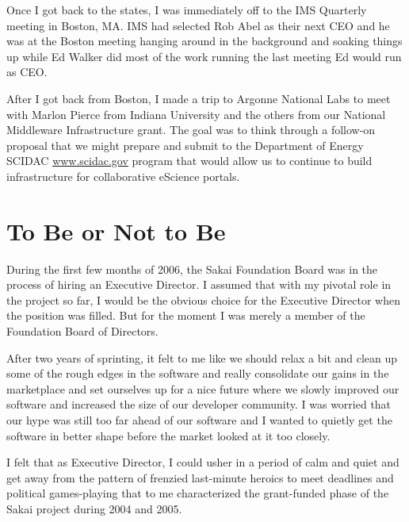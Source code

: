 \documentclass[12pt]{book}
\begin{document}

Once I got back to the states, I was immediately off to the IMS Quarterly
meeting in Boston, MA.  IMS had selected Rob Abel as their next CEO and
he was at the Boston meeting hanging around in the background and soaking
things up while Ed Walker did most of the work running the last
meeting Ed would run as CEO.

After I got back from Boston, I made a trip to Argonne National Labs
to meet with Marlon Pierce from Indiana University and the others
from our National Middleware Infrastructure grant.  The goal
was to think through a follow-on proposal that we might
prepare and submit to the
Department of Energy SCIDAC \url{www.scidac.gov} program
that would allow us to continue to build infrastructure
for collaborative eScience portals.







\chapter{To Be or Not to Be}

During the first few months of 2006, the Sakai
Foundation Board was in the
process of hiring an Executive Director.  I
assumed that with my pivotal role in the project so far,
I would be the obvious choice for the
Executive Director when the position was filled.  But for the
moment I was merely a member of the Foundation
Board of Directors.

After two years of sprinting, it
felt to me like we should relax a bit
and clean up some of the rough edges in the software and
really consolidate our gains in the marketplace and set
ourselves up for a nice future where we slowly improved
our software and increased the size of our developer
community.  I was worried that our hype was still too far
ahead of our software and I wanted to quietly get
the software in better shape before the market looked
at it too closely.

I felt that as Executive
Director, I could usher in a period of calm and quiet
and get away from the pattern of frenzied last-minute
heroics to meet deadlines and political games-playing
that to me characterized the grant-funded phase of the
Sakai project during 2004 and 2005.
\end{document}
